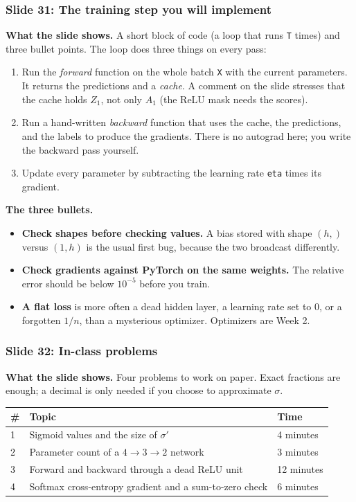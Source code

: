 \subsubsection{Slide 31: The training step you will implement}

\textbf{What the slide shows.} A short block of code (a loop that runs \texttt{T} times) and three bullet points. The loop does three things on every pass:
\begin{enumerate}
\item Run the \emph{forward} function on the whole batch \texttt{X} with the current parameters. It returns the predictions and a \emph{cache}. A comment on the slide stresses that the cache holds $Z_1$, not only $A_1$ (the ReLU mask needs the scores).
\item Run a hand-written \emph{backward} function that uses the cache, the predictions, and the labels to produce the gradients. There is no autograd here; you write the backward pass yourself.
\item Update every parameter by subtracting the learning rate \texttt{eta} times its gradient.
\end{enumerate}

\textbf{The three bullets.}
\begin{itemize}
\item \textbf{Check shapes before checking values.} A bias stored with shape $(h,)$ versus $(1,h)$ is the usual first bug, because the two broadcast differently.
\item \textbf{Check gradients against PyTorch on the same weights.} The relative error should be below $10^{-5}$ before you train.
\item \textbf{A flat loss} is more often a dead hidden layer, a learning rate set to $0$, or a forgotten $1/n$, than a mysterious optimizer. Optimizers are Week 2.
\end{itemize}

\subsubsection{Slide 32: In-class problems}

\textbf{What the slide shows.} Four problems to work on paper. Exact fractions are enough; a decimal is only needed if you choose to approximate $\sigma$.

\begin{center}
\begin{tabular}{p{0.6cm}p{9.5cm}p{2.4cm}}
\toprule
\# & Topic & Time \\
\midrule
1 & Sigmoid values and the size of $\sigma'$ & 4 minutes \\
2 & Parameter count of a $4\to3\to2$ network & 3 minutes \\
3 & Forward and backward through a dead ReLU unit & 12 minutes \\
4 & Softmax cross-entropy gradient and a sum-to-zero check & 6 minutes \\
\bottomrule
\end{tabular}
\end{center}

